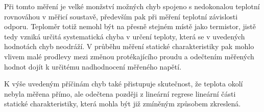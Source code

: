 \documentclass[0-protokol.tex]{subfiles}
\begin{document}
Při tomto měření je velké monžství možných chyb spojeno s nedokonalou teplotní rovnováhou v měřicí soustavě, především pak při měření teplotní závislosti odporu. Teploměr totiž nemohl být na přesně stejném místě jako termistor, jistě tedy vzniká určitá systematická chyba v určení teploty, která se v uvedených hodnotách chyb neodráží. V průběhu měření statické charakteristiky pak mohlo vlivem malé prodlevy mezi změnou protékajícího proudu a odečtením měřených hodnot dojít k určitému nadhodnocení měřeného napětí.

K výše uvedeným příčinám chyb také přistupuje skutečnost, že teplota okolí nebyla měřena přímo, ale odečtena později z lineární regrese lineární části statické charakteristiky, která mohla být již zmíněným způsobem zkreslená.
\end{document}

